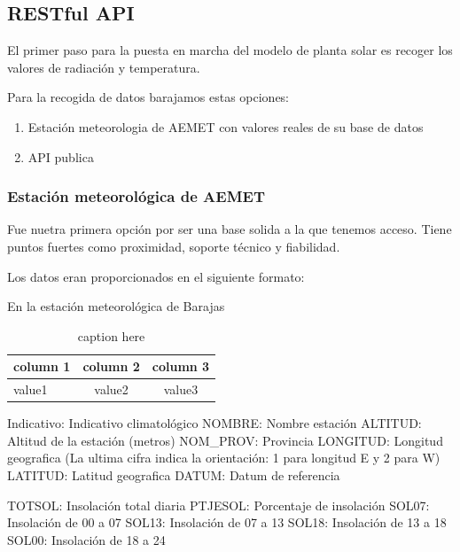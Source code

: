 \subsection{RESTful API} 
\label{sub:API}
El primer paso para la puesta en marcha del modelo de planta solar es recoger los valores de radiación y temperatura.

Para la recogida de datos barajamos estas opciones:
\begin{enumerate}
    \item Estación meteorologia de AEMET con valores reales de su base de datos
    \item API publica
\end{enumerate}


\subsubsection{Estación meteorológica de AEMET}
\label{ssub:estación_meteorológica_de_aemet}

Fue nuetra primera opción por ser una base solida a la que tenemos acceso. Tiene puntos fuertes como proximidad, soporte técnico y fiabilidad.

Los datos eran proporcionados en el siguiente formato:

En la estación meteorológica de Barajas

\begin{table}[tb]
    \caption{caption here}
    \label{tab:tablename}
    \centering

    \begin{tabular}{l|cc}
    \hline

    \hline
    \textbf{column 1} & \textbf{column 2} & \textbf{column 3} \\
    \hline
        value1 & value2 & value3\\
    \hline

    \hline
    \end{tabular}
\end{table}

Indicativo: Indicativo climatológico
NOMBRE: Nombre estación
ALTITUD: Altitud de la estación (metros)
NOM\_PROV: Provincia
LONGITUD: Longitud geografica
(La ultima cifra indica la orientación: 1 para longitud E y 2 para W)
LATITUD: Latitud geografica
DATUM: Datum de referencia

TOTSOL: Insolación total diaria
PTJESOL: Porcentaje de insolación
SOL07: Insolación de 00 a 07
SOL13: Insolación de 07 a 13
SOL18: Insolación de 13 a 18
SOL00: Insolación de 18 a 24

